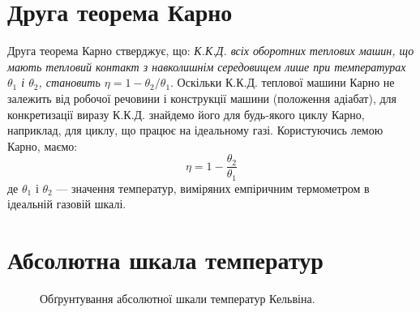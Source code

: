\section{Друга теорема Карно}

Друга теорема Карно стверджує, що: \emph{К.К.Д. всіх оборотних теплових машин, що мають тепловий
контакт з навколишнім середовищем лише при температурах $\theta_1$ і $\theta_2$, становить
$\eta=1-\theta_2/\theta_1$}. Оскільки К.К.Д. теплової машини Карно не залежить від робочої речовини і
конструкції машини (положення адіабат), для конкретизації виразу К.К.Д. знайдемо його для будь-якого
циклу Карно, наприклад, для циклу, що працює на ідеальному газі. Користуючись лемою Карно, маємо:
\begin{equation}\label{3.4}
	\eta=1-\dfrac{\theta_2}{\theta_1}
\end{equation}
де $\theta_1$ і $\theta_2$ --- значення температур, виміряних емпіричним термометром в ідеальній
газовій шкалі.

\section{Абсолютна шкала температур}

\begin{figure}[h!]\centering
    
	\caption{Обґрунтування абсолютної шкали температур Кельвіна.}
	\label{pic:3.3}
\end{figure}

